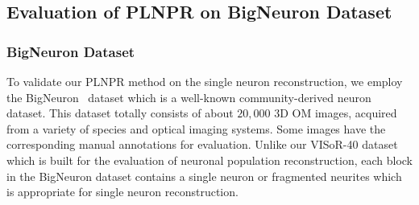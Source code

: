 



\subsection{Evaluation of PLNPR on BigNeuron Dataset}
\label{sec:exp_PLNPR_BigNeuron}

\subsubsection{BigNeuron Dataset}

To validate our PLNPR method on the single neuron reconstruction, we employ the BigNeuron~\cite{peng2015} dataset which is a well-known community-derived neuron dataset. 
This dataset totally consists of about $ 20,000 $ 3D OM images, acquired from a variety of species and optical imaging systems.
Some images have the corresponding manual annotations for evaluation.
Unlike our VISoR-40 dataset which is built for the evaluation of neuronal population reconstruction, each block in the BigNeuron dataset contains a single neuron or fragmented neurites which is appropriate for single neuron reconstruction.


